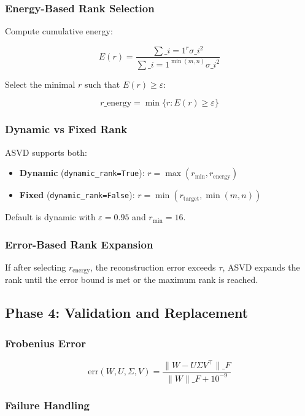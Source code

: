 \subsubsection{Energy-Based Rank Selection}

Compute cumulative energy:

\[
E(r) = \frac{\sum\_{i=1}^r \sigma\_i^2}{\sum\_{i=1}^{\min(m, n)} \sigma\_i^2}
\]

Select the minimal $r$ such that $E(r) \geq \varepsilon$:

\[
r\_\text{energy} = \min\{r : E(r) \geq \varepsilon\}
\]

\subsubsection{Dynamic vs Fixed Rank}

ASVD supports both:

\begin{itemize}
\item \textbf{Dynamic} (\texttt{dynamic\_rank=True}): $r = \max(r_\text{min}, r_\text{energy})$
\item \textbf{Fixed} (\texttt{dynamic\_rank=False}): $r = \min(r_\text{target}, \min(m, n))$

\end{itemize}
Default is dynamic with $\varepsilon = 0.95$ and 
$r_\text{min} = 16$.

\subsubsection{Error-Based Rank Expansion}

If after selecting $r_\text{energy}$, the reconstruction error exceeds 
$\tau$, ASVD expands the rank until the error bound is met or the maximum 
rank is reached.

\subsection{Phase 4: Validation and Replacement}

\subsubsection{Frobenius Error}

\[
\text{err}(W, U, \Sigma, V) = \frac{\|W - U \Sigma V^\top\|\_F}{\|W\|\_F + 10^{-9}}
\]

\subsubsection{Failure Handling}

